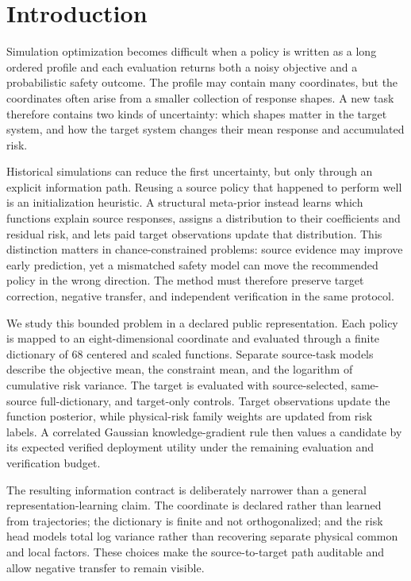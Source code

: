 \section{Introduction}\label{sec:meta_prior_introduction}

Simulation optimization becomes difficult when a policy is written as a long
ordered profile and each evaluation returns both a noisy objective and a
probabilistic safety outcome. The profile may contain many coordinates, but the
coordinates often arise from a smaller collection of response shapes. A new
task therefore contains two kinds of uncertainty: which shapes matter in the
target system, and how the target system changes their mean response and
accumulated risk.

Historical simulations can reduce the first uncertainty, but only through an
explicit information path. Reusing a source policy that happened to perform
well is an initialization heuristic. A structural meta-prior instead learns
which functions explain source responses, assigns a distribution to their
coefficients and residual risk, and lets paid target observations update that
distribution. This distinction matters in chance-constrained problems:
source evidence may improve early prediction, yet a mismatched safety model
can move the recommended policy in the wrong direction. The method must
therefore preserve target correction, negative transfer, and independent
verification in the same protocol.

We study this bounded problem in a declared public representation. Each
policy is mapped to an eight-dimensional coordinate and evaluated through a
finite dictionary of 68 centered and scaled functions. Separate source-task
models describe the objective mean, the constraint mean, and the logarithm of
cumulative risk variance. The target is evaluated with source-selected, same-source
full-dictionary, and target-only controls. Target observations update the
function posterior, while physical-risk family weights are updated from risk
labels. A
correlated Gaussian knowledge-gradient rule then values a candidate by its
expected verified deployment utility under the remaining evaluation and
verification budget.

The resulting information contract is deliberately narrower than a general
representation-learning claim. The coordinate is declared rather than
learned from trajectories; the dictionary is finite and not orthogonalized;
and the risk head models total log variance rather than recovering separate
physical common and local factors. These choices make the source-to-target
path auditable and allow negative transfer to remain visible.

